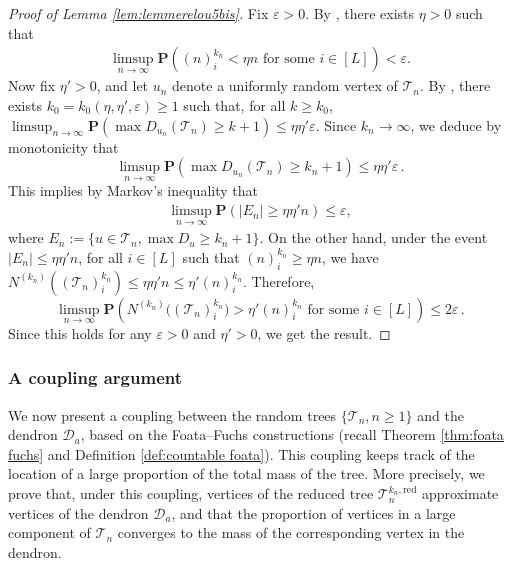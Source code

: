 \documentclass{article}
\theoremstyle{remark}
\newcommand{\cT}{\mathcal{T}}
\newcommand{\cD}{\mathcal{D}}
\newcommand{\prob}[1]{\mathbf{P}{\left(#1\right)}}
\newcommand{\red}{\mathrm{red}}
\begin{document}
\begin{proof}[Proof of Lemma \ref{lem:lemmerelou5bis}]
    Fix $\varepsilon>0$. By ,  there exists $\eta>0$ such that
    \begin{align*}
        \limsup_{n\to\infty} \prob{ (n)_i^{k_n} < \eta n \text{ for some } i \in [L]} < \varepsilon.
    \end{align*}
    Now fix $\eta'>0$, and let $u_n$ denote a uniformly random vertex of $\cT_n$.
    By , there exists $k_0 = k_0(\eta,\eta',\varepsilon) \ge 1$ such that, for all $k \geq k_0$, $\limsup_{n\to\infty}\prob{ \max D_{u_n}(\cT_n) \ge k+1 } \le \eta \eta' \varepsilon$. 
    Since $k_n\to\infty$, we deduce by monotonicity that
    \begin{equation*}
        \limsup_{n\to\infty}\prob{ \max D_{u_n}(\cT_n) \ge k_n+1 } \le \eta \eta' \varepsilon \,.
    \end{equation*}
    This implies by Markov's inequality that
    \begin{align*}
        \limsup_{n\to\infty} \prob{|E_{n}| \geq \eta \eta' n} \le \varepsilon,
    \end{align*}
    where $E_{n} := \{ u\in \cT_n, \max D_u \geq k_n+1\}$.
    On the other hand, under the event $|E_{n}| \leq \eta \eta' n$, for all $i \in [L]$ such that $(n)_i^{k_n} \geq \eta n$, we have $N^{(k_n)}((\cT_n)_i^{k_n}) \leq \eta \eta' n \leq \eta' (n)_i^{k_n}$. 
    Therefore,
    \begin{equation*}
        \limsup_{n\to\infty} \prob{ N^{(k_n)}\big( (\cT_n)_i^{k_n} \big) > \eta' (n)_i^{k_n} \text{ for some } i\in[L]}
        \le 2\varepsilon \,.
    \end{equation*}
    Since this holds for any $\varepsilon>0$ and $\eta'>0$, we get the result.
\end{proof}


\subsubsection{A coupling argument}
\label{sssec:coupling}

We now present a coupling between the random trees $\{\cT_n, n \geq 1\}$ and the dendron $\cD_a$, based on the Foata--Fuchs constructions (recall Theorem \ref{thm:foata fuchs} and Definition \ref{def:countable foata}). 
This coupling keeps track of the location of a large proportion of the total mass of the tree.
More precisely, we prove that, under this coupling, vertices of the reduced tree $\cT_n^{k_n,\red}$ approximate vertices of the dendron $\cD_a$, and that the proportion of vertices in a large component of $\cT_n$ converges to the mass of the corresponding vertex in the dendron.
\end{document}
